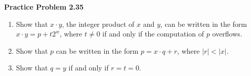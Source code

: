 \documentclass[11pt, oneside, a4paper]{article}
\begin{document}
\textbf{Practice Problem 2.35}
\begin{enumerate}
    \item Show that $x\cdot y$, the integer product of $x$ and $y$, can be written in the form
    $x \cdot y = p + t2^w$, where $t\neq 0$ if and only if the computation of $p$ overflows.



    \item Show that $p$ can be written in the form $p = x \cdot q + r$, where $|r| < |x|$.
    \item Show that $q = y$ if and only if $r = t = 0$.
\end{enumerate}
\end{document}
